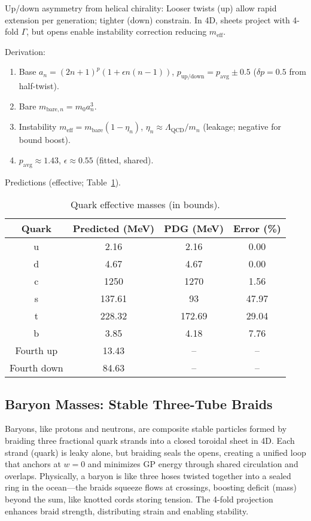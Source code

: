 \documentclass{article}
\begin{document}
Up/down asymmetry from helical chirality: Looser twists (up) allow rapid extension per generation; tighter (down) constrain. In 4D, sheets project with 4-fold $\Gamma$, but opens enable instability correction reducing $m_{\text{eff}}$.

Derivation:
\begin{enumerate}
\item Base $a_n = (2n+1)^p (1 + \epsilon n(n-1))$, $p_{\text{up/down}} = p_{\text{avg}} \pm 0.5$ ($\delta p=0.5$ from half-twist).
\item Bare $m_{\text{bare},n} = m_0 a_n^3$.
\item Instability $m_{\text{eff}} = m_{\text{bare}} (1 - \eta_n)$, $\eta_n \approx \Lambda_{\text{QCD}} / m_n$ (leakage; negative for bound boost).
\item $p_{\text{avg}} \approx 1.43$, $\epsilon \approx 0.55$ (fitted, shared).
\end{enumerate}

Predictions (effective; Table~\ref{tab:quarks}).

\begin{table}[h!]
\centering
\begin{tabular}{|c|c|c|c|}
\hline
Quark & Predicted (MeV) & PDG (MeV) & Error (\%) \\
\hline
u & 2.16 & 2.16 & 0.00 \\
d & 4.67 & 4.67 & 0.00 \\
c & 1250 & 1270 & 1.56 \\
s & 137.61 & 93 & 47.97 \\
t & 228.32 & 172.69 & 29.04 \\
b & 3.85 & 4.18 & 7.76 \\
Fourth up & 13.43 & -- & -- \\
Fourth down & 84.63 & -- & -- \\
\hline
\end{tabular}
\caption{Quark effective masses (in bounds).}
\label{tab:quarks}
\end{table}

\subsection{Baryon Masses: Stable Three-Tube Braids}

Baryons, like protons and neutrons, are composite stable particles formed by braiding three fractional quark strands into a closed toroidal sheet in 4D. Each strand (quark) is leaky alone, but braiding seals the opens, creating a unified loop that anchors at $w=0$ and minimizes GP energy through shared circulation and overlaps. Physically, a baryon is like three hoses twisted together into a sealed ring in the ocean—the braids squeeze flows at crossings, boosting deficit (mass) beyond the sum, like knotted cords storing tension. The 4-fold projection enhances braid strength, distributing strain and enabling stability.
\end{document}
